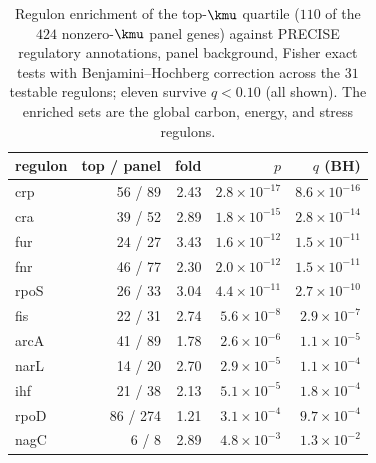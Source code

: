 \begin{table}[t]
\centering
\caption{Regulon enrichment of the top-$\kmu$ quartile ($110$ of
the $424$ nonzero-$\kmu$ panel genes) against PRECISE regulatory
annotations, panel background, Fisher exact tests with
Benjamini--Hochberg correction across the $31$ testable regulons;
eleven survive $q < 0.10$ (all shown). The enriched sets are the
global carbon, energy, and stress regulons.}
\label{tab:regulons}
\small
\begin{tabular}{lrrrr}
\toprule
regulon & top / panel & fold & $p$ & $q$ (BH) \\
\midrule
crp & 56 / 89 & 2.43 & $2.8 \times 10^{-17}$ & $8.6 \times 10^{-16}$ \\
cra & 39 / 52 & 2.89 & $1.8 \times 10^{-15}$ & $2.8 \times 10^{-14}$ \\
fur & 24 / 27 & 3.43 & $1.6 \times 10^{-12}$ & $1.5 \times 10^{-11}$ \\
fnr & 46 / 77 & 2.30 & $2.0 \times 10^{-12}$ & $1.5 \times 10^{-11}$ \\
rpoS & 26 / 33 & 3.04 & $4.4 \times 10^{-11}$ & $2.7 \times 10^{-10}$ \\
fis & 22 / 31 & 2.74 & $5.6 \times 10^{-8}$ & $2.9 \times 10^{-7}$ \\
arcA & 41 / 89 & 1.78 & $2.6 \times 10^{-6}$ & $1.1 \times 10^{-5}$ \\
narL & 14 / 20 & 2.70 & $2.9 \times 10^{-5}$ & $1.1 \times 10^{-4}$ \\
ihf & 21 / 38 & 2.13 & $5.1 \times 10^{-5}$ & $1.8 \times 10^{-4}$ \\
rpoD & 86 / 274 & 1.21 & $3.1 \times 10^{-4}$ & $9.7 \times 10^{-4}$ \\
nagC & 6 / 8 & 2.89 & $4.8 \times 10^{-3}$ & $1.3 \times 10^{-2}$ \\
\bottomrule
\end{tabular}
\end{table}

